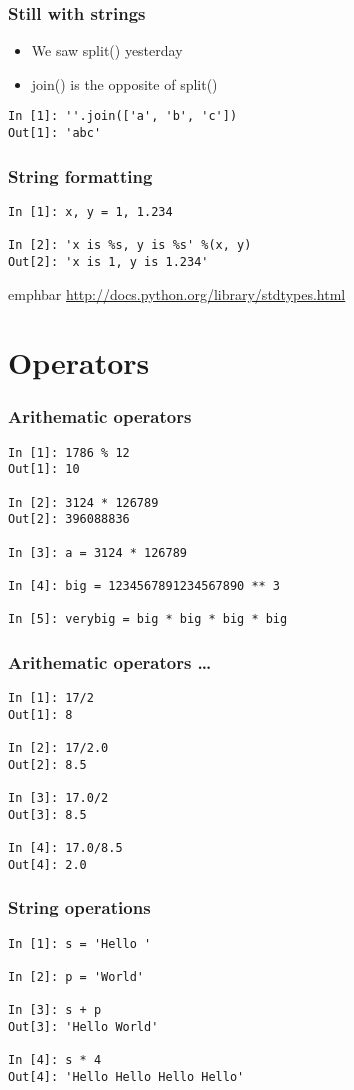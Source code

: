 \documentclass[14pt,compress]{beamer}
\newcommand{\emphbar}[1]
{\begin{beamercolorbox}[rounded=true]{emphbar} 
      {#1}
 \end{beamercolorbox}
}
\newcounter{time}
\newcommand{\inctime}[1]{\addtocounter{time}{#1}{\tiny \thetime\ m}}
\begin{document}
\begin{frame}[fragile]
\frametitle{Still with strings}
  \begin{itemize}
    \item We saw split() yesterday
    \item join() is the opposite of split()
  \end{itemize}
  \begin{lstlisting}
In [1]: ''.join(['a', 'b', 'c'])
Out[1]: 'abc'
  \end{lstlisting}
\end{frame}

\begin{frame}[fragile]
\frametitle{String formatting}
  \begin{lstlisting}
In [1]: x, y = 1, 1.234

In [2]: 'x is %s, y is %s' %(x, y)
Out[2]: 'x is 1, y is 1.234'
  \end{lstlisting}
  \emphbar{\url{http://docs.python.org/library/stdtypes.html}}
  \inctime{10}
\end{frame}

\section{Operators}
\begin{frame}[fragile]
  \frametitle{Arithematic operators}
  \begin{lstlisting}
In [1]: 1786 % 12
Out[1]: 10

In [2]: 3124 * 126789
Out[2]: 396088836

In [3]: a = 3124 * 126789

In [4]: big = 1234567891234567890 ** 3

In [5]: verybig = big * big * big * big
  \end{lstlisting}
\end{frame}

\begin{frame}[fragile]
  \frametitle{Arithematic operators \ldots}
  \begin{lstlisting}
In [1]: 17/2
Out[1]: 8

In [2]: 17/2.0
Out[2]: 8.5

In [3]: 17.0/2
Out[3]: 8.5

In [4]: 17.0/8.5
Out[4]: 2.0
  \end{lstlisting}
\end{frame}

\begin{frame}[fragile]
  \frametitle{String operations}
  \begin{lstlisting}
In [1]: s = 'Hello '

In [2]: p = 'World'

In [3]: s + p 
Out[3]: 'Hello World'

In [4]: s * 4
Out[4]: 'Hello Hello Hello Hello'
  \end{lstlisting}
\end{frame}
\end{document}
